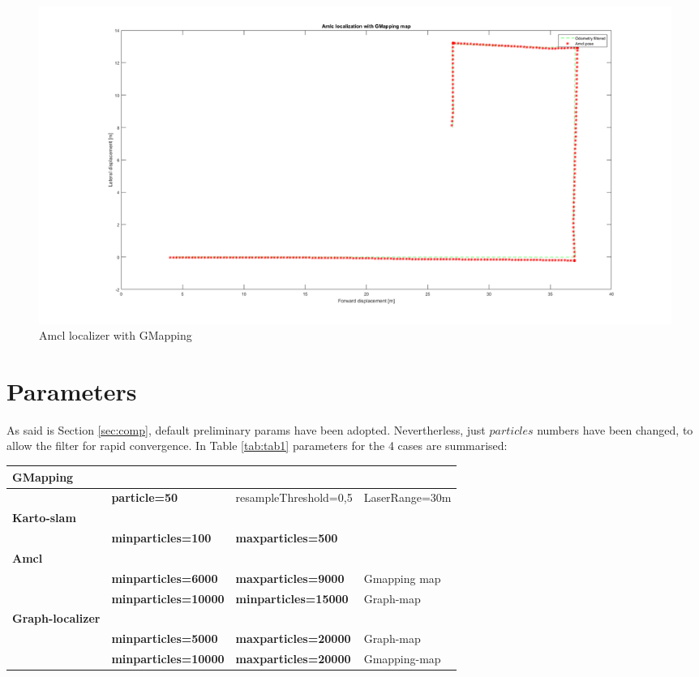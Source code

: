 \documentclass[11pt,a4paper]{article}
\begin{document}
\begin{figure}[H]
	\center
	\includegraphics[width=1\textwidth]{figures/Fig4.png}
	\caption{Amcl localizer with GMapping}
	\label{fig:fig4}
\end{figure}


\section{Parameters} \label{sec:par}

As said is Section \ref{sec:comp}, default preliminary params have been adopted. Nevertherless, just $particles$ numbers have been changed, to allow the filter for rapid convergence. In Table \ref{tab:tab1} parameters for the 4 cases are summarised:

\begin{center}
 \label{tab:tab1}
\begin{tabular}{| m{8em} | m{13em}| m{13em}| m{9em}|} 
\hline
\textbf{GMapping} & & &\\
\hline
& \textbf{particle=50} & resampleThreshold=0,5 & LaserRange=30m\\
\hline
\textbf{Karto-slam} & & &\\
\hline
&\textbf{minparticles=100} & \textbf{maxparticles=500} &\\
\hline
\textbf{Amcl} & & &\\
\hline
&\textbf{minparticles=6000} &\textbf{maxparticles=9000} & Gmapping map\\
\hline
&\textbf{minparticles=10000} & \textbf{minparticles=15000} & Graph-map\\
\hline
\textbf{Graph-localizer} & & &\\
\hline
&\textbf{minparticles=5000} & \textbf{maxparticles=20000} & Graph-map\\
\hline
&\textbf{minparticles=10000} & \textbf{maxparticles=20000} & Gmapping-map\\
\hline
\end{tabular}
\end{center}
\end{document}
